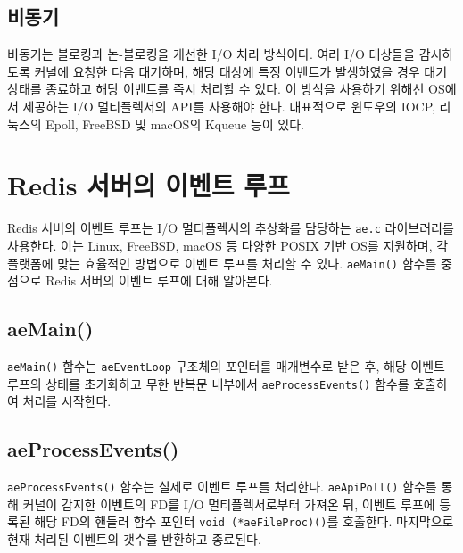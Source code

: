 \documentclass[11pt]{article}
\begin{document}
\subsection{비동기}
비동기는 블로킹과 논-블로킹을 개선한 I/O 처리 방식이다. 여러 I/O 대상들을 감시하도록
커널에 요청한 다음 대기하며, 해당 대상에 특정 이벤트가 발생하였을 경우 대기 상태를
종료하고 해당 이벤트를 즉시 처리할 수 있다. 이 방식을 사용하기 위해선 OS에서 제공하는
I/O 멀티플렉서의 API를 사용해야 한다. 대표적으로 윈도우의 IOCP, 리눅스의 Epoll,
FreeBSD 및 macOS의 Kqueue 등이 있다.

\section{Redis 서버의 이벤트 루프}
Redis 서버의 이벤트 루프는 I/O 멀티플렉서의 추상화를 담당하는 \texttt{ae.c}
라이브러리를 사용한다. 이는 Linux, FreeBSD, macOS 등 다양한 POSIX 기반 OS를
지원하며, 각 플랫폼에 맞는 효율적인 방법으로 이벤트 루프를 처리할 수 있다.
\texttt{aeMain()} 함수를 중점으로 Redis 서버의 이벤트 루프에 대해 알아본다.

\vspace{.2in}
\vspace{.2in}

\subsection{aeMain()}
\texttt{aeMain()} 함수는 \texttt{aeEventLoop} 구조체의 포인터를 매개변수로 받은
후, 해당 이벤트 루프의 상태를 초기화하고 무한 반복문 내부에서
\texttt{aeProcessEvents()} 함수를 호출하여 처리를 시작한다.

\subsection{aeProcessEvents()}
\texttt{aeProcessEvents()} 함수는 실제로 이벤트 루프를 처리한다.
\texttt{aeApiPoll()} 함수를 통해 커널이 감지한 이벤트의 FD를 I/O 멀티플렉서로부터
가져온 뒤, 이벤트 루프에 등록된 해당 FD의 핸들러 함수 포인터
\texttt{void (*aeFileProc)()}를 호출한다. 마지막으로 현재 처리된 이벤트의 갯수를
반환하고 종료된다.
\end{document}
